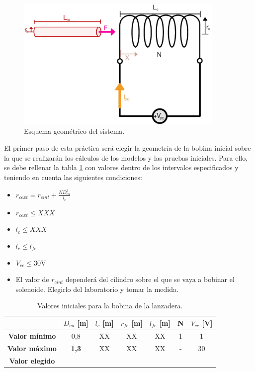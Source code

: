 \begin{figure}[H]
    \centering 
    \includegraphics[width=10cm]{FigurasMemoria/esquemaDesTeor.jpg}
    \caption{Esquema geométrico del sistema.}
    \label{fig:esquemaGeomPractica} %
\end{figure}

El primer paso de esta práctica será elegir la geometría de la bobina inicial sobre la que se realizarán los cálculos de los modelos y las pruebas iniciales. Para ello, se debe rellenar la tabla \ref{tab:bobIniPractica} con valores dentro de los intervalos especificados y teniendo en cuenta las siguientes condiciones:

\begin{itemize}
    \item \(r_{cext} = r_{cint} + \frac{ND_{cu}^2}{l_c}\)
    \item \(r_{cext} \leq XXX\)
    \item \(l_c \leq XXX\)
    \item \(l_c \leq l_{fe}\)
    \item \(V_{cc} \leq 30\)V
    \item El valor de \(r_{cint}\) dependerá del cilindro sobre el que se vaya a bobinar el solenoide. Elegirlo del laboratorio y tomar la medida.
\end{itemize}

\begin{table}[H]
    \centering
    \setlength{\tabcolsep}{5pt}
    \renewcommand{\arraystretch}{1.2}
    \begin{tabular}{|c|c|c|c|c|c|c|}
        \hline
        \hbox{} & \textbf{\(D_{cu}\) [m]} & \textbf{\(l_c\) [m]} & \textbf{\(r_{fe}\) [m]} & \textbf{\(l_{fe}\) [m]} & \textbf{N} & \textbf{\(V_{cc}\) [V]} \\
        \hline
        \textbf{Valor mínimo} & 0,8 & XX & XX & XX & 1 & 1 \\
        \textbf{Valor máximo} & \textbf{1,3} & XX & XX & XX & - & 30 \\
        \hline
        \textbf{Valor elegido} &  &  &  &  &  &  \\
        \hline
    \end{tabular}
    \caption{Valores iniciales para la bobina de la lanzadera.}
    \label{tab:bobIniPractica}
\end{table}


